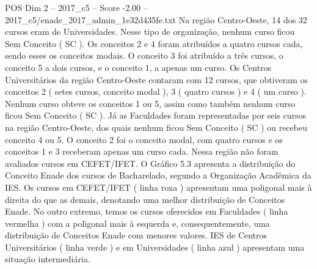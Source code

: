 \begin{textsample}{POS Dim 2 – 2017\_c5 – Score -2.00 – 2017\_c5/enade\_2017\_admin\_1e32d435fe.txt}
Na região Centro-Oeste, 14 dos 32 cursos eram de Universidades.
Nesse tipo de organização, nenhum curso ficou Sem Conceito ( SC ).
Os conceitos 2 e 4 foram atribuídos a quatro cursos cada, sendo esses os conceitos modais.
O conceito 3 foi atribuído a três cursos, o conceito 5 a dois cursos, e o conceito 1, a apenas um curso.
Os Centros Universitários da região Centro-Oeste contaram com 12 cursos, que obtiveram os conceitos 2 ( setes cursos, conceito modal ), 3 ( quatro cursos ) e 4 ( um curso ).
Nenhum curso obteve os conceitos 1 ou 5, assim como também nenhum curso ficou Sem Conceito ( SC ).
Já as Faculdades foram representadas por seis cursos na região Centro-Oeste, dos quais nenhum ficou Sem Conceito ( SC ) ou recebeu conceito 4 ou 5.
O conceito 2 foi o conceito modal, com quatro cursos e os conceitos 1 e 3 receberam apenas um curso cada.
Nessa região não foram avaliados cursos em CEFET/IFET.
O Gráfico 5.3 apresenta a distribuição do Conceito Enade dos cursos de Bacharelado, segundo a Organização Acadêmica da IES.
Os cursos em CEFET/IFET ( linha roxa ) apresentam uma poligonal mais à direita do que as demais, denotando uma melhor distribuição de Conceitos Enade.
No outro extremo, temos os cursos oferecidos em Faculdades ( linha vermelha ) com a poligonal mais à esquerda e, consequentemente, uma distribuição de Conceitos Enade com menores valores.
IES de Centros Universitários ( linha verde ) e em Universidades ( linha azul ) apresentam uma situação intermediária.

\end{textsample}
